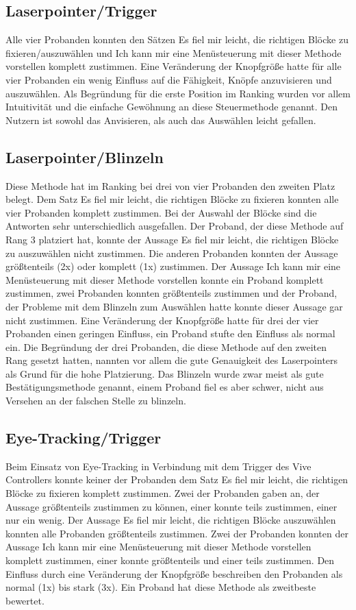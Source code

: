 \subsection{Laserpointer/Trigger}
Alle vier Probanden konnten den Sätzen \glqq Es fiel mir leicht, die richtigen Blöcke zu fixieren/auszuwählen\grqq{} und \glqq Ich kann mir eine Menüsteuerung mit dieser Methode vorstellen\grqq{} komplett zustimmen. Eine Veränderung der Knopfgröße hatte für alle vier Probanden \glqq ein wenig\grqq{} Einfluss auf die Fähigkeit, Knöpfe anzuvisieren und auszuwählen. Als Begründung für die erste Position im Ranking wurden vor allem Intuitivität und die einfache Gewöhnung an diese Steuermethode genannt. Den Nutzern ist sowohl das Anvisieren, als auch das Auswählen leicht gefallen. 
\subsection{Laserpointer/Blinzeln}
Diese Methode hat im Ranking bei drei von vier Probanden den zweiten Platz belegt. Dem Satz \glqq Es fiel mir leicht, die richtigen Blöcke zu fixieren\grqq{} konnten alle vier Probanden komplett zustimmen. Bei der Auswahl der Blöcke sind die Antworten sehr unterschiedlich ausgefallen. Der Proband, der diese Methode auf Rang 3 platziert hat, konnte der Aussage \glqq Es fiel mir leicht, die richtigen Blöcke zu auszuwählen\grqq{} nicht zustimmen. Die anderen Probanden konnten der Aussage größtenteils (2x) oder komplett (1x) zustimmen. Der Aussage \glqq Ich kann mir eine Menüsteuerung mit dieser Methode vorstellen\grqq{} konnte ein Proband komplett zustimmen, zwei Probanden konnten größtenteils zustimmen und der Proband, der Probleme mit dem Blinzeln zum Auswählen hatte konnte dieser Aussage gar nicht zustimmen. Eine Veränderung der Knopfgröße hatte für drei der vier Probanden einen geringen Einfluss, ein Proband stufte den Einfluss als normal ein. Die Begründung der drei Probanden, die diese Methode auf den zweiten Rang gesetzt hatten, nannten vor allem die gute Genauigkeit des Laserpointers als Grund für die hohe Platzierung. Das Blinzeln wurde zwar meist als gute Bestätigungsmethode genannt, einem Proband fiel es aber schwer, nicht aus Versehen an der falschen Stelle zu blinzeln. 
\subsection{Eye-Tracking/Trigger}
Beim Einsatz von Eye-Tracking in Verbindung mit dem Trigger des Vive Controllers konnte keiner der Probanden dem Satz \grqq Es fiel mir leicht, die richtigen Blöcke zu fixieren\grqq{} komplett zustimmen. Zwei der Probanden gaben an, der Aussage größtenteils zustimmen zu können, einer konnte teils zustimmen, einer nur ein wenig. Der Aussage \grqq Es fiel mir leicht, die richtigen Blöcke auszuwählen\grqq{} konnten alle Probanden größtenteils zustimmen. Zwei der Probanden konnten der Aussage \grqq Ich kann mir eine Menüsteuerung mit dieser Methode vorstellen\grqq{} komplett zustimmen, einer konnte größtenteils und einer teils zustimmen. Den Einfluss durch eine Veränderung der Knopfgröße beschreiben den Probanden als normal (1x) bis stark (3x). Ein Proband hat diese Methode als zweitbeste bewertet.

